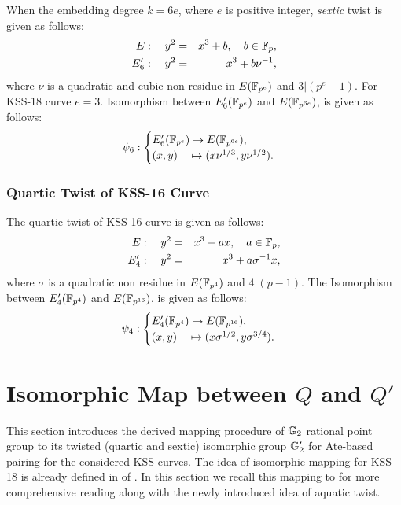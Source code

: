 When the embedding degree $k = 6e$, where $e$ is positive integer, \textit{sextic} twist  is given as follows:
\begin{eqnarray}
E:  \quad y^2 & = & x^3+b, \quad b \in {\mathbb{F}}_{p}, \\
E'_6: \quad y^2 & =  & x^3+b\nu^{-1},
\end{eqnarray}  
where $\nu$ is a quadratic and cubic non residue in $E({\mathbb{F}}_{p^{e}})$ and $3|(p^e-1)$.  For KSS-18 curve $e=3$. Isomorphism between $E'_6({\mathbb{F}}_{p^{e}})$ and $E({\mathbb{F}}_{p^{6e}})$, is given as follows:
\begin{eqnarray}
\psi_6 : \begin{cases}
E'_6({\mathbb{F}}_{p^{e}}) \rightarrow E({\mathbb{F}}_{p^{6e}}),\\
(x,y) \quad \mapsto (x\nu^{1/3},y\nu^{1/2}).
\end{cases}
\end{eqnarray}


\subsubsection{Quartic Twist of KSS-16 Curve} 
\label{sec:ch:ijnc:kss16twist}
The quartic twist of KSS-16 curve is given as  follows:
\begin{eqnarray}
E:  \quad y^2 & = & x^3+ax, \quad a \in {\mathbb{F}}_{p}, \\
E'_4: \quad y^2 & =  & x^3+a\sigma^{-1}x,
\end{eqnarray}  
where $\sigma$ is a quadratic non residue in $E({\mathbb{F}}_{p^{4}})$ and $4|(p-1)$.  The Isomorphism between $E'_4({\mathbb{F}}_{p^{4}})$ and $E({\mathbb{F}}_{p^{16}})$, is given as follows:
\begin{eqnarray}
\psi_4 : \begin{cases}
E'_4({\mathbb{F}}_{p^{4}}) \rightarrow E({\mathbb{F}}_{p^{16}}),\\
(x,y) \quad \mapsto (x\sigma^{1/2},y\sigma^{3/4}).
\end{cases}
\end{eqnarray}

\section{Isomorphic Map between \texorpdfstring{$Q$}{Q} and \texorpdfstring{$Q'$}{Q'}}
This section introduces the derived mapping procedure of ${\mathbb{G}}_{2}$ rational point group to its twisted (quartic and  sextic) isomorphic group ${\mathbb{G}}_{2}'$ for Ate-based pairing for the considered KSS curves. 
The idea of isomorphic mapping for KSS-18  is already defined in   of . 
In this section we recall this mapping to for more comprehensive reading along with the newly introduced idea of aquatic twist.


